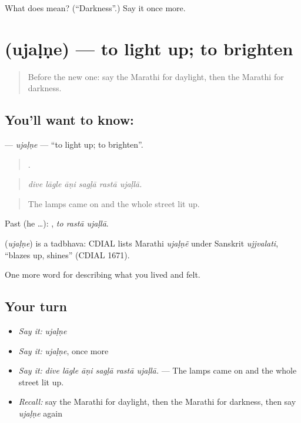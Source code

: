 \begin{tcolorbox}[breakable,colback=teal!4,colframe=teal!35!black,title={Before you move on}]
What does  mean? (\textquotedblleft{}Darkness\textquotedblright{}.) Say it once more.
\end{tcolorbox}
\section[\texorpdfstring{\mr{उजळणे} (ujaḷṇe)}{उजळणे (ujaḷṇe)}]{ (ujaḷṇe) — to light up; to brighten}

\label{lesson:MR-C519-ujalne}



\begin{quote}
Before the new one: say the Marathi for daylight, then the Marathi for darkness.
\end{quote}

\subsection*{You'll want to know: }
\textbf{} — \emph{ujaḷṇe} — \textquotedblleft{}to light up; to brighten\textquotedblright{}.

\begin{quote}
     .
\end{quote}

\begin{quote}
\emph{dive lāgle āṇi sagḷā rastā ujaḷlā.}
\end{quote}

\begin{quote}
The lamps came on and the whole street lit up.
\end{quote}

Past (he …):   , \emph{to rastā ujaḷlā}.

\begin{cousinweb}
\textbf{} (\emph{ujaḷṇe}) is a tadbhava: CDIAL lists Marathi \emph{ujaḷṇẽ} under Sanskrit \emph{ujjvalati}, \textquotedblleft{}blazes up, shines\textquotedblright{} (CDIAL 1671).
\end{cousinweb}

\begin{grammarlens}[title={What you've built}]
One more word for describing what you lived and felt.
\end{grammarlens}

\subsection*{Your turn}
\begin{itemize}
\raggedright
  \item \emph{Say it:} \emph{ujaḷṇe}
  \item \emph{Say it:} \emph{ujaḷṇe}, once more
  \item \emph{Say it:} \emph{dive lāgle āṇi sagḷā rastā ujaḷlā.} — The lamps came on and the whole street lit up.
  \item \emph{Recall:} say the Marathi for daylight, then the Marathi for darkness, then say \emph{ujaḷṇe} again
\end{itemize}

